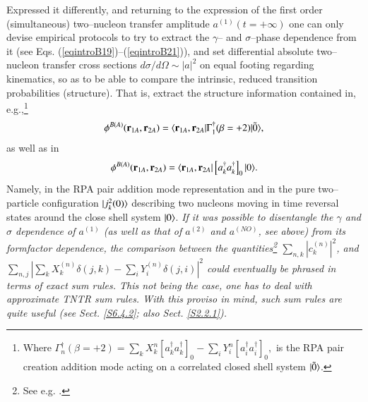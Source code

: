 \begin{subappendices}
 
 Expressed it differently, and returning to the expression of the first order (simultaneous) two--nucleon transfer amplitude $a^{(1)}(t=+\infty)$ one can only devise empirical protocols to try to extract the $\gamma$-- and $\sigma$--phase dependence  from it (see Eqs. (\ref{eqintroB19})--(\ref{eqintroB21})), and set differential absolute two--nucleon transfer cross sections $d\sigma/d\Omega\sim |a|^2$ on equal footing regarding kinematics, so as to be able to compare the intrinsic, reduced transition probabilities (structure). That is, extract the structure information contained in, e.g.,\footnote{Where
 	$\Gamma_n^\dagger(\beta=+2)=\sum_k X_k^n\left[a^\dagger_ka^\dagger_k\right]_0-\sum_i Y^n_i \left[a^\dagger_i a^\dagger_i\right]_0,$
 	is the RPA pair creation addition mode acting on  a correlated closed shell system $|{\tilde 0} \rangle$. }
 \begin{align}
 \phi^{B(A)}(\mathbf r_{1A},\mathbf r_{2A})=\langle {\mathbf r_{1A},\mathbf r_{2A}|\Gamma^\dagger_1(\beta=+2)|\tilde 0} \rangle,
 \end{align}
 as well as in
 \begin{align}\label{eq2.D.48}
 \phi^{B(A)}(\mathbf r_{1A},\mathbf r_{2A})=\langle {\mathbf r_{1A},\mathbf r_{2A}}|\left[a^\dagger_ka^\dagger_k\right]_0|{0} \rangle.
 \end{align}
 Namely, in the RPA pair addition mode representation and in the pure two--particle configuration $|{j^2_k(0)} \rangle$ describing two nucleons moving in time reversal states around the close shell system $|{0} \rangle$. \textit{If it was possible to disentangle the $\gamma$ and $\sigma$ dependence of $a^{(1)}$ (as well as that of $a^{(2)}$ and $a^{(NO)}$, see above) from its formfactor dependence, the comparison between the quantities\footnote{See e.g. \cite{Broglia:67}.} $\sum_{n,k}|c^{(n)}_k|^2$, and\\ $\sum_{n,j}\left|\sum_kX^{(n)}_k\delta(j,k)-\sum_iY^{(n)}_i\delta(j,i)\right|^2$ could  eventually be phrased in terms of exact sum rules. This not being  the case, one has to  deal with approximate TNTR sum rules. With this proviso in mind, such sum rules are quite useful (see Sect. \ref{S6.4.2}; also  Sect. \ref{S2.2.1}).} 
 
 

\end{subappendices}
